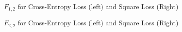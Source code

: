 \documentclass[fleqn]{article}
\begin{document}
\begin{figure}[H]
    \centering
    \qquad
    \caption{$F_{1,2}$ for Cross-Entropy Loss (left) and Square Loss (Right)}
    \label{fig:error_plot_2_v2}
\end{figure}
\begin{figure}[H]
    \centering
    \qquad
    \caption{$F_{2,2}$ for Cross-Entropy Loss (left) and Square Loss (Right)}
    \label{fig:error_plot_3}
\end{figure}
\end{document}
